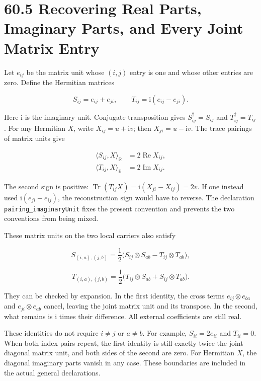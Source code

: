 \documentclass[
  11pt,
  oneside]{book}
\begin{document}
\section{60.5 Recovering Real Parts, Imaginary Parts, and Every Joint
Matrix Entry}

Let \(e_{ij}\) be the matrix unit whose \((i,j)\) entry is one and whose
other entries are zero. Define the Hermitian matrices

\[
S_{ij}=e_{ij}+e_{ji},\qquad
T_{ij}=\mathrm i(e_{ij}-e_{ji}).
\]

Here \(\mathrm i\) is the imaginary unit. Conjugate transposition gives
\(S_{ij}^\dagger=S_{ij}\) and \(T_{ij}^\dagger=T_{ij}\). For any
Hermitian \(X\), write \(X_{ij}=u+\mathrm i v\); then
\(X_{ji}=u-\mathrm i v\). The trace pairings of matrix units give

\[
\begin{aligned}
\langle S_{ij},X\rangle_{\mathbb R}
&=2\operatorname{Re}X_{ij},\\
\langle T_{ij},X\rangle_{\mathbb R}
&=2\operatorname{Im}X_{ij}.
\end{aligned}
\]

The second sign is positive:
\(\operatorname{Tr}(T_{ij}X)=\mathrm i(X_{ji}-X_{ij})=2v\). If one
instead used \(\mathrm i(e_{ji}-e_{ij})\), the reconstruction sign would
have to reverse. The declaration \texttt{pairing\_\allowbreak imaginary\allowbreak Unit} fixes
the present convention and prevents the two conventions from being
mixed.

These matrix units on the two local carriers also satisfy

\[
S_{(i,a),(j,b)}
=\frac12\bigl(S_{ij}\otimes S_{ab}
-T_{ij}\otimes T_{ab}\bigr),
\]

\[
T_{(i,a),(j,b)}
=\frac12\bigl(T_{ij}\otimes S_{ab}
+S_{ij}\otimes T_{ab}\bigr).
\]

They can be checked by expansion. In the first identity, the cross terms
\(e_{ij}\otimes e_{ba}\) and \(e_{ji}\otimes e_{ab}\) cancel, leaving
the joint matrix unit and its transpose. In the second, what remains is
\(\mathrm i\) times their difference. All external coefficients are
still real.

These identities do not require \(i\ne j\) or \(a\ne b\). For example,
\(S_{ii}=2e_{ii}\) and \(T_{ii}=0\). When both index pairs repeat, the
first identity is still exactly twice the joint diagonal matrix unit,
and both sides of the second are zero. For Hermitian \(X\), the diagonal
imaginary parts vanish in any case. These boundaries are included in the
actual general declarations.
\end{document}
